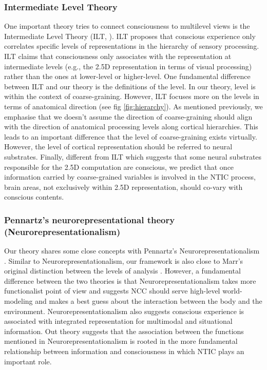 \documentclass[utf8]{article}
\begin{document}
			\subsubsection*{Intermediate Level Theory} \label{IntermediateLevelTheory}
                One important theory tries to connect consciousness to multilevel views is the Intermediate Level Theory (ILT, \cite{jackendoff1987consciousness, prinz2007intermediate}). ILT proposes that conscious experience only correlates specific levels of representations in the hierarchy of sensory processing. ILT claims that consciousness only associates with the representation at intermediate levels (e.g., the 2.5D representation in terms of visual processing) rather than the ones at lower-level or higher-level. 
                One fundamental difference between ILT and our theory is the definitions of the level. In our theory, level is within the context of coarse-graining. However, ILT focuses more on the levels in terms of anatomical direction (see fig \ref{fig:hierarchy}). As mentioned previously, we emphasise that we doesn't assume the direction of coarse-graining should align with the direction of anatomical processing levels along cortical hierarchies. This leads to an important difference that the level of coarse-graining exists virtually. However, the level of cortical representation should be referred to neural substrates. Finally, different from ILT which suggests that some neural substrates responsible for the 2.5D computation are conscious, we predict that once information carried by coarse-grained variables is involved in the NTIC process, brain areas, not exclusively within 2.5D representation, should  co-vary with conscious contents. 
				
			\subsubsection*{Pennartz's neurorepresentational theory (Neurorepresentationalism)}
			    Our theory shares some close concepts with Pennartz's Neurorepresentationalism \citep{pennartz2018consciousness,pennartz2015brain}. Similar to Neurorepresentationalism, our framework is also close to Marr's original distinction between the levels of analysis \citep{marr1982vision, pennartz2015brain, pennartz2018consciousness}. However, a fundamental difference between the two theories is that Neurorepresentationalism takes more functionalist point of view and suggests NCC should serve high-level world-modeling and makes a best guess about the interaction between the body and the environment. Neurorepresentationalism also suggests conscious experience is associated with integrated representation for multimodal and situational information. Out theory suggests that the association between the functions mentioned in Neurorepresentationalism is rooted in the more fundamental relationship between information and consciousness in which NTIC plays an important role. 
	
\end{document}
